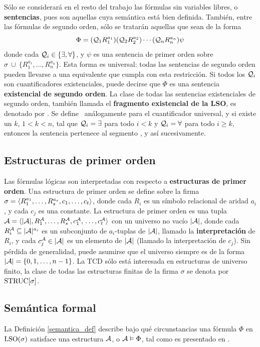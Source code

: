 Sólo se considerará en el resto del trabajo las fórmulas sin variables libres,
o \textbf{sentencias}, pues son aquellas cuya semántica está bien definida.
También, entre las fórmulas de segundo orden, sólo se tratarán aquellas que
sean de la forma
\[ \Phi = (\mathcal{Q}_1R_1^{a_1})(\mathcal{Q}_2R_2^{a_2})\cdots(\mathcal{Q}_nR_n^{a_n})\psi \]
donde cada $\mathcal{Q}_i \in \{\exists,\forall\}$, y
$\psi$ es una sentencia de primer orden sobre $\sigma\ \cup\ \{R_1^{a_1},\ldots,R_n^{a_n}\}$.
Esta forma es universal: todas las sentencias de segundo orden pueden llevarse
a una equivalente que cumpla con esta restricción.
Si todos los $\mathcal{Q}_i$ son cuantificadores existenciales, puede decirse que
$\Phi$ es una sentencia \textbf{existencial de segundo orden}.
La clase de todas las sentencias existenciales de segundo orden, también
llamada el \textbf{fragmento existencial de la LSO}, es denotado por \SOE. Se
define \SOA\ análogamente para el cuantificador universal,
y si existe un $k$, $1<k<n$, tal que $\mathcal{Q}_i=\exists$ para todo $i<k$
y $\mathcal{Q}_i=\forall$ para todo $i\geq k$, entonces la sentencia
pertenece al segmento \SOEA, y así sucesivamente.

\subsection{Estructuras de primer orden}
Las fórmulas lógicas son interpretadas con respecto a \textbf{estructuras de primer
orden}. Una estructura de primer orden se define sobre la firma
$\sigma=\langle R_1^{a_1},\ldots,R_s^{a_s},\\c_1,\ldots,c_t \rangle$, donde cada $R_i$ es
un símbolo relacional de aridad $a_i$, y cada $c_j$ es una constante. 
La estructura de primer orden es una tupla
$\mathcal{A}=\langle |\mathcal{A}|,R_1^{\mathcal{A}},\ldots,R_s^{\mathcal{A}},c_1^{\mathcal{A}},\\\ldots,c_t^{\mathcal{A}} \rangle$ con un universo
no vacío $|\mathcal{A}|$, donde cada $R_i^{\mathcal{A}}\subseteq|\mathcal{A}|^{a_i}$ es un subconjunto de
$a_i$-tuplas de $|\mathcal{A}|$, llamado la \textbf{interpretación} de $R_i$, y cada
$c_j^{\mathcal{A}}\in|\mathcal{A}|$ es un elemento de $|\mathcal{A}|$ (llamado la interpretación de $c_j$).
Sin pérdida de generalidad, puede asumirse que el universo siempre es de la
forma $|\mathcal{A}|=\{0,1,\ldots,n-1\}$.
La TCD sólo está interesada en estructuras de universo finito, la clase de
todas las estructuras finitas de la firma $\sigma$ se denota por $\text{STRUC}[\sigma]$.

\subsection{Semántica formal}
La Definición \ref{semantica_def} describe bajo qué circunstancias una fórmula $\Phi$ en
$\text{LSO}(\sigma)$ satisface una estructura $\mathcal{A}$, o $\mathcal{A} \vDash \Phi$, tal como es
presentado en \cite{immerman:book}.

